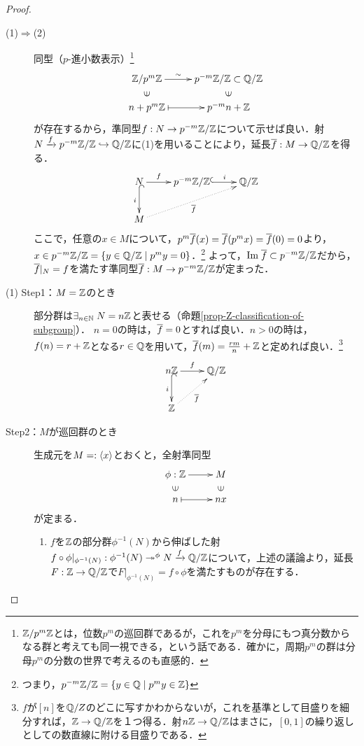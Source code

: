 \documentclass[uplatex,dvipdfmx]{jsreport}
\begin{document}
\begin{proof}\mbox{}
    \begin{description}
        \item[(1)$\Rightarrow$(2)] 同型（$p$-進小数表示）\footnote{$\mathbb{Z}/p^m\mathbb{Z}$とは，位数$p^m$の巡回群であるが，これを$p^m$を分母にもつ真分数からなる群と考えても同一視できる，という話である．確かに，周期$p^m$の群は分母$p^m$の分数の世界で考えるのも直感的．}
        \[\xymatrix@R-2pc{
            \Z/p^m\Z\ar[r]^-\sim&p^{-m}\Z/\Z\subset\Q/\Z\\
            \rotatebox[origin=c]{90}{$\in$}&\rotatebox[origin=c]{90}{$\in$}\\
            n+p^m\Z\ar@{|->}[r]&p^{-m}n+\Z
        }\]
        が存在するから，準同型$f:N\to p^{-m}\mathbb{Z}/\mathbb{Z}$について示せば良い．射$N\xrightarrow{f}p^{-m}\mathbb{Z}/\mathbb{Z}\hookrightarrow\mathbb{Q}/\mathbb{Z}$に(1)を用いることにより，延長$\overline{f}:M\to\mathbb{Q}/\mathbb{Z}$を得る．
        \[\xymatrix{
            N\ar[r]^-f \ar@{^{(}->}[d]_-i&p^{-m}\Z/\Z \ar@{^{(}->}[r]^-{i}&\Q/\Z\\
            M\ar@{.>}[urr]_-{\o{f}}
        }\]
        ここで，任意の$x\in M$について，$p^m\overline{f}(x)=\overline{f}(p^mx)=\overline{f}(0)=0$より，$x\in p^{-m}\mathbb{Z}/\mathbb{Z}=\left\{y\in\mathbb{Q}/\mathbb{Z}\mid p^my=0\right\}$．\footnote{つまり，$p^{-m}\mathbb{Z}/\mathbb{Z}=\{y\in\mathbb{Q}\mid p^my\in\mathbb{Z}\}$}
        よって，$\mathrm{Im}\;\overline{f}\subset p^{-m}\mathbb{Z}/\mathbb{Z}$だから，$\overline{f}|_N=f$を満たす準同型$\overline{f}:M\to p^{-m}\mathbb{Z}/\mathbb{Z}$が定まった．
        \item[(1) Step1：$M=\mathbb{Z}$のとき]
        部分群は$\exists_{n\in\mathbb{N}}\;N=n\mathbb{Z}$と表せる（命題\ref{prop-Z-classification-of-subgroup}）．
        $n=0$の時は，$\overline{f}=0$とすれば良い．$n>0$の時は，$f(n)=r+\mathbb{Z}$となる$r\in\mathbb{Q}$を用いて，$\overline{f}(m)=\frac{rm}{n}+\mathbb{Z}$と定めれば良い．\footnote{$f$が$[n]$を$\mathbb{Q}/Z$のどこに写すかわからないが，これを基準として目盛りを細分すれば，$\mathbb{Z}\to\mathbb{Q}/\mathbb{Z}$を１つ得る．射$n\mathbb{Z}\to\mathbb{Q}/\mathbb{Z}$はまさに，$[0,1]$の繰り返しとしての数直線に附ける目盛りである．}
        \[\xymatrix{
            n\Z\ar[r]^-f \ar@{^{(}->}[d]_-i&\Q/\Z\\
            \Z\ar@{.>}[ur]_-{\o{f}}
        }\]
        \item[Step2：$M$が巡回群のとき]
        生成元を$M=:\langle x\rangle$とおくと，全射準同型
        \[\xymatrix@R-2pc{
            \phi:\Z\ar[r]&M\\
            \rotatebox[origin=c]{90}{$\in$}&\rotatebox[origin=c]{90}{$\in$}\\
            n\ar@{|->}[r]&nx
        }\]
        が定まる．
        \begin{enumerate}
            \item 
            $f$を$\mathbb{Z}$の部分群$\phi^{-1}(N)$から伸ばした射$f\circ\phi|_{\phi^{-1}(N)}:\phi^{-1}(N)\twoheadrightarrow^\phi N\xrightarrow{f}\mathbb{Q}/\mathbb{Z}$について，上述の議論より，延長$F:\mathbb{Z}\to\mathbb{Q}/\mathbb{Z}$で$F|_{\phi^{-1}(N)}=f\circ\phi$を満たすものが存在する．

\end{enumerate}
\end{description}
\end{proof}
\end{document}
